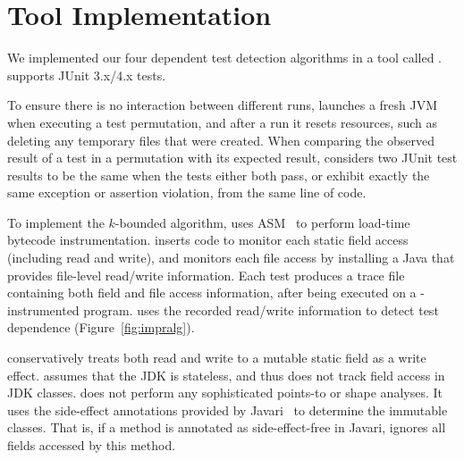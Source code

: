 \section{Tool Implementation}
\label{sec:impl}


We implemented our four dependent test detection algorithms in
a tool called \ourtool. \ourtool
supports JUnit 3.x/4.x tests. %

To ensure there is no interaction between
different runs, \ourtool launches a fresh JVM
when executing a test permutation, and after a run it resets resources,
such as deleting any temporary files that were created.
When comparing the observed result of
a test in a permutation with its expected result,
\ourtool considers two JUnit test results to be the same when the
tests either both pass, or exhibit exactly the same exception
or assertion violation, from the same line of code.

To implement the \dependenceaware{} $k$-bounded
algorithm, \ourtool uses ASM~\cite{asm} to perform load-time bytecode
instrumentation. \ourtool inserts code to monitor each
static field access (including read and write), and
monitors each file access by
installing a Java  that provides 
file-level read/write information.
Each test produces a trace file containing both
field and file access information, after being executed
on a \ourtool-instrumented program. \ourtool uses
the recorded read/write information to detect
test dependence (Figure~\ref{fig:impralg}).

\ourtool conservatively treats both read
and write to a mutable static field as a write effect.
\ourtool assumes that the JDK is stateless,
and thus does not track field access in JDK classes. 
\ourtool does not perform any sophisticated points-to or shape
analyses. It uses the side-effect annotations
provided by Javari~\cite{QuinonezTE2008} to determine the immutable
classes. That is, if a method is annotated as side-effect-free
in Javari, \ourtool ignores all fields accessed by this method.



